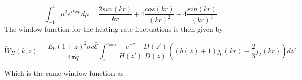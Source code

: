 \documentclass[twocolumns]{emulateapj}
\begin{document}
\begin{equation}
  \label{eq:bes2}
  \int_{-1}^{1}\mu^2 e^{i k r \mu} d\mu=\frac{2 sin(kr)}{kr}+4\frac{cos(kr)}{(kr)^2}-4\frac{sin(kr)}{(kr)^3}.
\end{equation}
The window function for the heating rate fluctuations is then given by 

\begin{equation}
  \label{eq:heat_fluc}
  \tilde{W}_H(k,z)=\frac{E_0(1+z)^2\sigma c \mathcal{\bar{E}}}{4\pi\bar{\dot{q}}}\int_z^{z_{max}} \frac{e^{-\tau}}{H(z')}\frac{D(z')}{D(z)}\left((b(z)+1)j_0(kr)-\frac{2}{3}j_2(kr)\right)dz'.
\end{equation}

Which is the same window function as  \citet{2007MNRAS.376.1680P,2005ApJ...626....1B}. 





 
\end{document}
